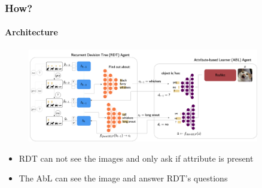 \documentclass[9pt]{beamer}
\begin{document}
\begin{frame}
\frametitle{How?}
\framesubtitle{Architecture}
\begin{figure}
	\centering
	\includegraphics[width=0.9\textwidth]{images/uncertaintRDTC.pdf} 
	\label{fig:uncertainRDTC}
\end{figure}
\begin{itemize}
	\item RDT can not see the images and only ask if attribute is present
	\item The AbL can see the image and answer RDT's questions
\end{itemize}
\end{frame} 





\end{document}
